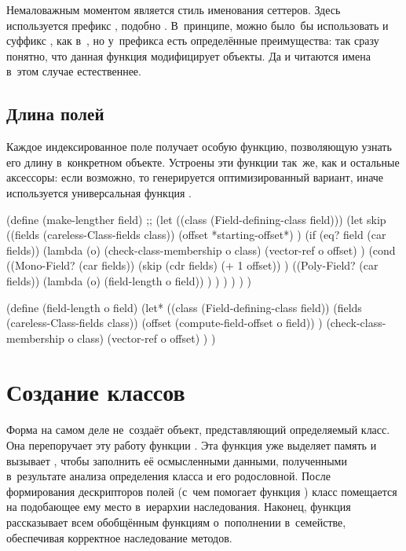 Немаловажным моментом является стиль именования сеттеров. Здесь используется
префикс , подобно . В~принципе, можно было~бы использовать
и суффикс , как в~, но у~префикса есть определённые
преимущества: так сразу понятно, что данная функция модифицирует объекты. Да и
читаются имена в~этом случае естественнее.


\subsection{Длина полей}\label{objects/accomp/ssect:len}

Каждое индексированное поле получает особую функцию, позволяющую узнать его
длину в~конкретном объекте. Устроены эти функции так~же, как и остальные
аксессоры: если возможно, то генерируется оптимизированный вариант, иначе
используется универсальная функция .

\begin{code:lisp}
(define (make-lengther field)
  ;; 
  (let ((class (Field-defining-class field)))
    (let skip ((fields (careless-Class-fields class))
               (offset *starting-offset*) )
      (if (eq? field (car fields))
          (lambda (o)
            (check-class-membership o class)
            (vector-ref o offset) )
          (cond ((Mono-Field? (car fields))
                 (skip (cdr fields) (+ 1 offset)) )
                ((Poly-Field? (car fields))
                 (lambda (o)
                   (field-length o field)) ) ) ) ) ) )

(define (field-length o field)
  (let* ((class  (Field-defining-class field))
         (fields (careless-Class-fields class))
         (offset (compute-field-offset o field)) )
    (check-class-membership o class)
    (vector-ref o offset) ) )
\end{code:lisp}


\section{Создание классов}\label{objects/sect:create-class}

Форма  на самом деле не~создаёт объект, представляющий
определяемый класс. Она перепоручает эту работу функции .
Эта функция уже выделяет память и вызывает , чтобы
заполнить её осмысленными данными, полученными в~результате анализа определения
класса и его родословной. После формирования дескрипторов полей (с~чем помогает
функция ) класс помещается на подобающее ему место в~иерархии
наследования. Наконец, функция  рассказывает всем обобщённым
функциям о~пополнении в~семействе, обеспечивая корректное наследование методов.

